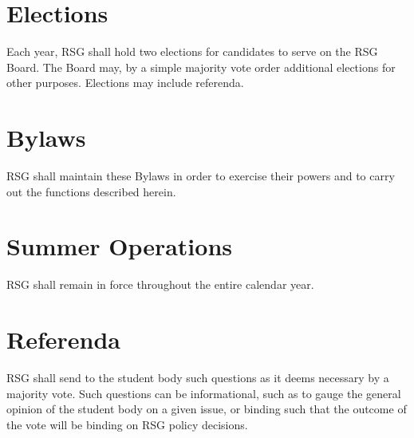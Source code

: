 \section{Elections} Each year, RSG shall hold two elections for candidates to serve on the RSG Board. The Board may, by a simple majority vote order additional elections for other purposes. Elections may include referenda. 

\section{Bylaws} RSG shall maintain these Bylaws in order to exercise their powers and to carry 
out the functions described herein. 

\section{Summer Operations} RSG shall remain in force throughout the entire calendar 
year.

\section{Referenda} RSG shall send to the student body such questions as it deems 
necessary by a majority vote. Such questions can be informational, such as to 
gauge the general opinion of the student body on a given issue, or binding such that 
the outcome of the vote will be binding on RSG policy decisions.
